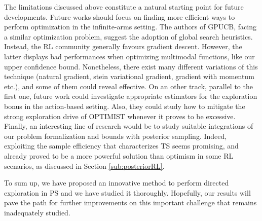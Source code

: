 The limitations discussed above constitute a natural starting point for future developments.
Future works should focus on finding more efficient ways to perform optimization in
the infinite-arms setting. The authors of \gls{GPUCB}, facing a similar optimization problem, suggest the adoption of global search heuristics. Instead, the \gls{RL} community generally favours gradient descent. However, the latter displays bad performances when optimizing multimodal functions, like our upper confidence bound. Nonetheless, there exist many different variations of this technique (natural gradient, stein variational gradient, gradient with momentum etc.), and some of them could reveal effective.
On an other track, parallel to the first one, future work could investigate appropriate estimators for the exploration bonus in the action-based setting. Also, they could study how to mitigate the strong exploration drive of \gls{OPTIMIST} whenever it proves to be excessive.
Finally, an interesting line of research would be to study suitable integrations of our problem formalization and bounds with posterior sampling. Indeed, exploiting the sample efficiency that characterizes \gls{TS} seems promising, and already proved to be a more powerful solution than optimism in some \gls{RL} scenarios, as discussed in Section \ref{sub:posteriorRL}. 

To sum up, we have proposed an innovative method to perform directed exploration in \gls{PS} and we have studied it thoroughly. Hopefully, our results will pave the path for further improvements on this important challenge that remains inadequately studied.